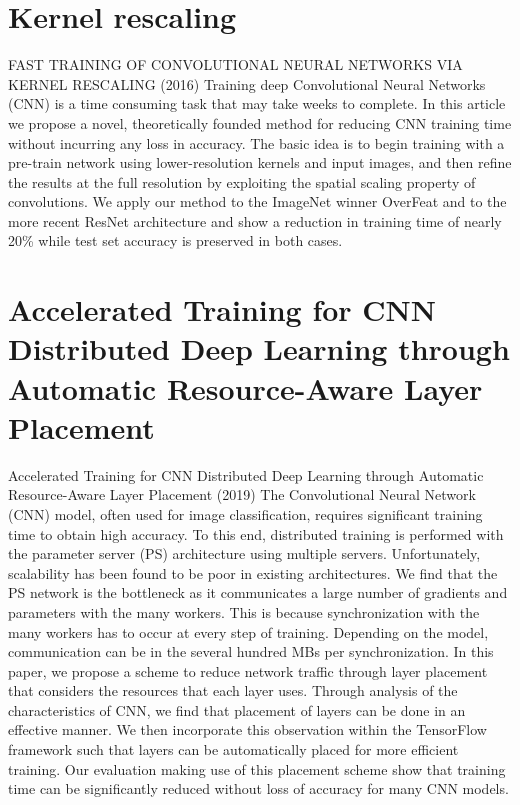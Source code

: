 \documentclass[10pt]{beamer}
\begin{document}
\section{Kernel rescaling}

\begin{frame}{FAST TRAINING OF CONVOLUTIONAL
NEURAL NETWORKS VIA KERNEL RESCALING (2016)}
Training deep Convolutional Neural Networks (CNN) is a time consuming task that may take weeks to complete. In this article we propose a novel, theoretically founded method for reducing CNN training time without incurring any loss in accuracy. The basic idea is to begin training with a pre-train network using lower-resolution kernels and input images, and then refine the results at the full resolution by exploiting the spatial scaling property of convolutions. We apply our method to the ImageNet winner OverFeat and to the more recent ResNet architecture and show a reduction in training time of nearly 20\% while test set accuracy is preserved in both cases.
\end{frame}

\section{Accelerated Training for CNN Distributed Deep Learning
through Automatic Resource-Aware Layer Placement}

\begin{frame}{Accelerated Training for CNN Distributed Deep Learning through Automatic Resource-Aware Layer Placement (2019)}
The Convolutional Neural Network (CNN) model, often used for image classification, requires significant training time to obtain high accuracy. To this end, distributed training is performed with the parameter server (PS) architecture using multiple servers. Unfortunately, scalability has been found to be poor in existing architectures. We find that the PS network is the bottleneck as it communicates a large number of gradients and parameters with the many workers. This is because synchronization with the many workers has to occur at every step of training. Depending on the model, communication can be in the several hundred MBs per synchronization. In this paper, we propose a scheme to reduce network traffic through layer placement that considers the resources that each layer uses. Through analysis of the characteristics of CNN, we find that placement of layers can be done in an effective manner. We then incorporate this observation within the TensorFlow framework such that layers can be automatically placed for more efficient training. Our evaluation making use of this placement scheme show that training time can be significantly reduced without loss of accuracy for many CNN models.
\end{frame}
\end{document}
